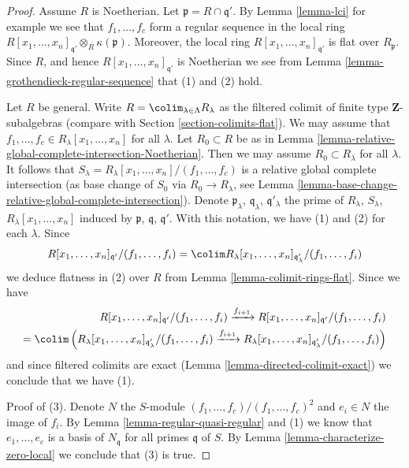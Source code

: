 \begin{proof}
Assume $R$ is Noetherian. Let $\mathfrak p = R \cap \mathfrak q'$.
By Lemma \ref{lemma-lci} for example we see
that $f_1, \ldots, f_c$ form a regular sequence in the local ring
$R[x_1, \ldots, x_n]_{\mathfrak q'} \otimes_R \kappa(\mathfrak p)$.
Moreover, the local ring $R[x_1, \ldots, x_n]_{\mathfrak q'}$
is flat over $R_{\mathfrak p}$. Since $R$, and hence
$R[x_1, \ldots, x_n]_{\mathfrak q'}$ is Noetherian we see from
Lemma \ref{lemma-grothendieck-regular-sequence} that (1) and (2) hold.

\medskip\noindent
Let $R$ be general. Write $R = \colim_{\lambda \in \Lambda} R_\lambda$
as the filtered colimit of finite type $\mathbf{Z}$-subalgebras (compare with
Section \ref{section-colimits-flat}). We may assume that
$f_1, \ldots, f_c \in R_\lambda[x_1, \ldots, x_n]$ for all $\lambda$.
Let $R_0 \subset R$ be as in
Lemma \ref{lemma-relative-global-complete-intersection-Noetherian}.
Then we may assume $R_0 \subset R_\lambda$ for all $\lambda$.
It follows that $S_\lambda = R_\lambda[x_1, \ldots, x_n]/(f_1, \ldots, f_c)$
is a relative global complete intersection (as base change of
$S_0$ via $R_0 \to R_\lambda$, see 
Lemma \ref{lemma-base-change-relative-global-complete-intersection}).
Denote $\mathfrak p_\lambda$, $\mathfrak q_\lambda$, $\mathfrak q'_\lambda$
the prime of $R_\lambda$, $S_\lambda$, $R_\lambda[x_1, \ldots, x_n]$
induced by $\mathfrak p$, $\mathfrak q$, $\mathfrak q'$.
With this notation, we have (1) and (2) for each $\lambda$. Since
$$
R[x_1, \ldots, x_n]_{\mathfrak q'}/(f_1, \ldots, f_i)
=
\colim R_\lambda[x_1, \ldots, x_n]_{\mathfrak q_\lambda'}/(f_1, \ldots, f_i)
$$
we deduce flatness in (2) over $R$ from
Lemma \ref{lemma-colimit-rings-flat}.
Since we have
\begin{align*}
R[x_1, \ldots, x_n]_{\mathfrak q'}/(f_1, \ldots, f_i)
\xrightarrow{f_{i + 1}}
R[x_1, \ldots, x_n]_{\mathfrak q'}/(f_1, \ldots, f_i) \\
=
\colim
\left(
R_\lambda[x_1, \ldots, x_n]_{\mathfrak q_\lambda'}/(f_1, \ldots, f_i)
\xrightarrow{f_{i + 1}}
R_\lambda[x_1, \ldots, x_n]_{\mathfrak q_\lambda'}/(f_1, \ldots, f_i)
\right)
\end{align*}
and since filtered colimits are exact
(Lemma \ref{lemma-directed-colimit-exact})
we conclude that we have (1).

\medskip\noindent
Proof of (3). Denote $N$ the $S$-module
$(f_1, \ldots, f_c)/(f_1, \ldots, f_c)^2$ and $e_i \in N$ the image of $f_i$.
By Lemma \ref{lemma-regular-quasi-regular} and (1) we know that
$e_1, \ldots, e_c$ is a basis of $N_\mathfrak q$ for all
primes $\mathfrak q$ of $S$. By Lemma \ref{lemma-characterize-zero-local}
we conclude that (3) is true.
\end{proof}

